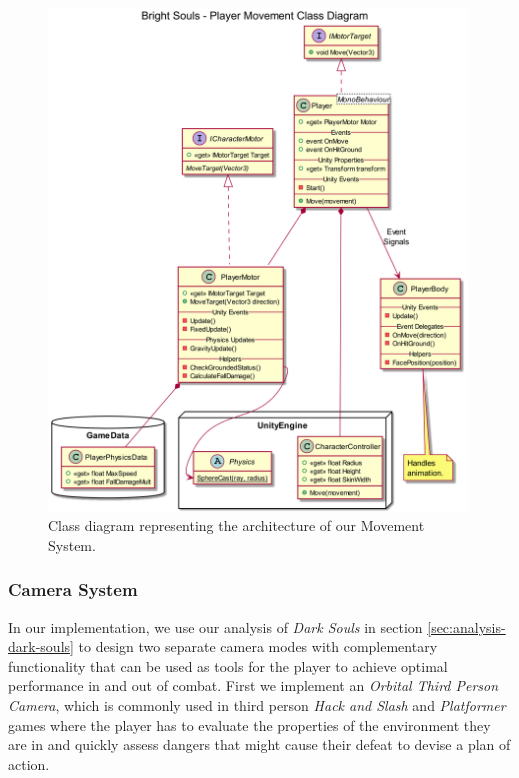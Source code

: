 \begin{figure}[!ht]
    \caption{Class diagram representing the architecture of our Movement System.}
    \vspace{0.5em}
    \begin{center}
        \includegraphics[width=30em]{figures/fig-player-movement-class-diagram.png}
    \end{center}
    \label{fig:movement-class-diagram}
\end{figure}


\subsubsection{Camera System}
\label{sec:lock-on-camera}

In our implementation, we use our analysis of \emph{Dark Souls} in section \ref{sec:analysis-dark-souls} to design two separate camera modes with complementary functionality that can be used as tools for the player to achieve optimal performance in and out of combat. First we implement an \emph{Orbital Third Person Camera}, which is commonly used in third person \emph{Hack and Slash} and \emph{Platformer} games where the player has to evaluate the properties of the environment they are in and quickly assess dangers that might cause their defeat to devise a plan of action.

